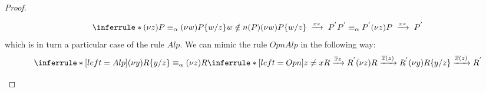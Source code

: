\begin{theorem}
\begin{proof}
\begin{description}
	\[
	  \inferrule *{
	      (\nu z)P\equiv_{\alpha} (\nu w)P\{w/z\}
	    \\
	      w\notin n(P)
	    \\
	      (\nu w)P\{w/z\}\;
		\xrightarrow{xz}\;
		  P^{'}
	    \\
	      P^{'}\equiv_{\alpha} P^{'}
	  }{
	    (\nu z)P\; 
	      \xrightarrow{xz}\;
		P^{'}
	  }
	\]
	which is in turn a particular case of the rule $Alp$.
	We can mimic the rule $OpnAlp$ in the following way:
	    \[
	      \inferrule* [left=Alp]{
		  (\nu y)R\{y/z\}\equiv_{\alpha} (\nu z)R
		\\
		  \inferrule* [left=Opn]{
		      z\neq x
		    \\
		      R\xrightarrow{\overline{x}z}R^{'}
		  }{
		    (\nu z)R\xrightarrow{\overline{x}(z)}R^{'}
		  }
	      }{
		(\nu y)R\{y/z\}\xrightarrow{\overline{x}(z)}R^{'}
	      }
	    \]
    \end{description}
  \end{proof}
\end{theorem}










































































